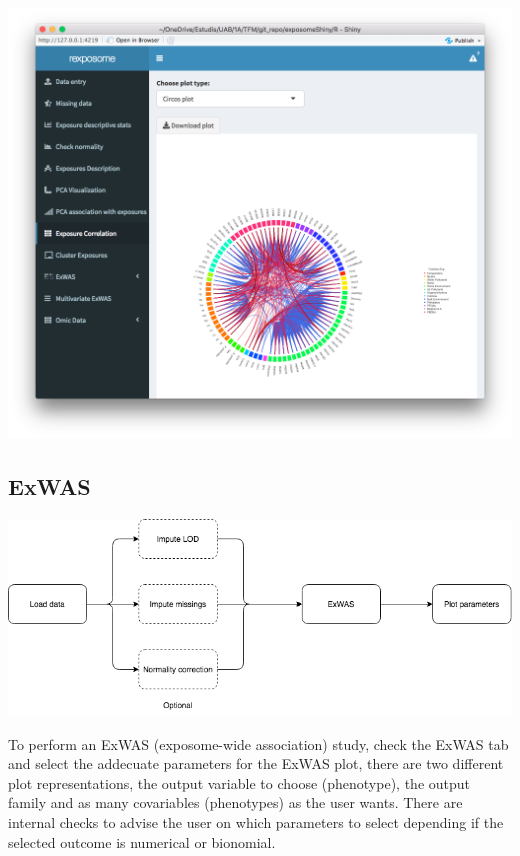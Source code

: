 \documentclass[
]{book}
\begin{document}
\includegraphics{images/analysis6_3.png}

\hypertarget{exwas}{%
\subsection{ExWAS}\label{exwas}}

\includegraphics{images/analysis7_1.png}

To perform an ExWAS (exposome-wide association) study, check the ExWAS tab and select the addecuate parameters for the ExWAS plot, there are two different plot representations, the output variable to choose (phenotype), the output family and as many covariables (phenotypes) as the user wants. There are internal checks to advise the user on which parameters to select depending if the selected outcome is numerical or bionomial.
\end{document}
